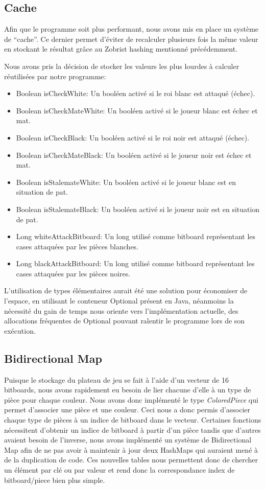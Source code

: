 \documentclass{article}
\begin{document}
\subsection{Cache}
Afin que le programme soit plus performant, nous avons mis en place un système de ``cache''. Ce dernier permet d'éviter de recalculer plusieurs fois la même valeur en stockant le résultat grâce au Zobrist hashing mentionné précédemment.

Nous avons pris la décision de stocker les valeurs les plus lourdes à calculer réutilisées par notre programme:
\begin{itemize}
    \item Boolean isCheckWhite: Un booléen activé si le roi blanc est attaqué (échec).
    \item Boolean isCheckMateWhite: Un booléen activé si le joueur blanc est échec et mat.
    \item Boolean isCheckBlack: Un booléen activé si le roi noir est attaqué (échec).
    \item Boolean isCheckMateBlack: Un booléen activé si le joueur noir est échec et mat.
    \item Boolean isStalemateWhite: Un booléen activé si le joueur blanc est en situation de pat.
    \item Boolean isStalemateBlack: Un booléen activé si le joueur noir est en situation de pat.
    \item Long whiteAttackBitboard: Un long utilisé comme bitboard représentant les cases attaquées par les pièces blanches.
    \item Long blackAttackBitboard: Un long utilisé comme bitboard représentant les cases attaquées par les pièces noires.
\end{itemize}

L'utilisation de types élémentaires aurait été une solution pour économiser de l'espace, en utilisant le conteneur Optional présent en Java, néanmoins la nécessité du gain de temps nous oriente vers l'implémentation actuelle, des allocations fréquentes de Optional pouvant ralentir le programme lors de son exécution.

\subsection{Bidirectional Map}
Puisque le stockage du plateau de jeu se fait à l'aide d'un vecteur de 16 bitboards, nous avons rapidement eu besoin de lier chacune d'elle à un type de pièce pour chaque couleur.
Nous avons donc implémenté le type \textit{ColoredPiece} qui permet d'associer une pièce et une couleur. Ceci nous a donc permis d'associer chaque type de pièces à un indice
de bitboard dans le vecteur. Certaines fonctions nécessitent d'obtenir un indice de bitboard à partir d'un pièce tandis que d'autres avaient besoin de l'inverse, nous avons implémenté un système
de Bidirectional Map afin de ne pas avoir à maintenir à jour deux HashMaps qui auraient mené à de la duplication de code. Ces nouvelles tables nous permettent donc de chercher un élément par clé ou par valeur et rend donc la
correspondance index de bitboard/piece bien plus simple.
\end{document}

